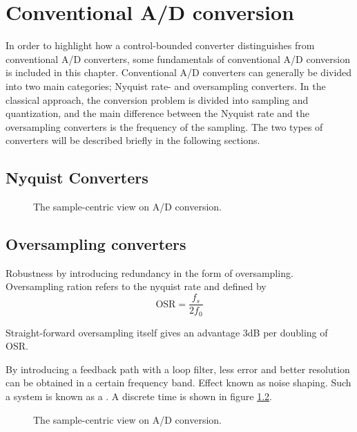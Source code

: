
\chapter{Conventional A/D conversion}
\label{sec:conventional_adc}
In order to highlight how a control-bounded converter distinguishes from conventional A/D converters, some fundamentals of conventional A/D conversion is included in this chapter. Conventional A/D converters can generally be divided into two main categories; Nyquist rate- and oversampling converters. In the classical approach, the conversion problem is divided into sampling and quantization, and the main difference between the Nyquist rate and the oversampling converters is the frequency of the sampling. The two types of converters will be described briefly in the following sections.

\section{Nyquist Converters}


\label{subsec:nyquist_adc}
\begin{figure}[htbp]
    
    \centering
    \caption{The sample-centric view on A/D conversion.}
    \label{fig:sample_centric_adc}
\end{figure}

\section{Oversampling converters}
\label{subsec:oversampling_adc}
Robustness by introducing redundancy in the form of oversampling. Oversampling ration refers to the nyquist rate and defined by
\begin{equation}
    \text{OSR} = \frac{f_s}{2f_0}
\end{equation}

Straight-forward oversampling itself gives an advantage 3dB per doubling of OSR.

By introducing a feedback path with a loop filter, less error and better resolution can be obtained in a certain frequency band. Effect known as noise shaping. Such a system is known as a \sdmod. A discrete time \sdmod is shown in figure \ref{fig:dtsdmod}.

\begin{figure}[htbp]
    
    \centering
    \caption{The sample-centric view on A/D conversion.}
    \label{fig:dtsdmod}
\end{figure}

